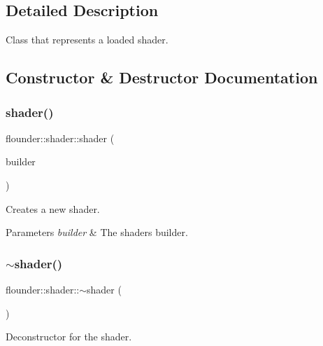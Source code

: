 \subsection{Detailed Description}
Class that represents a loaded shader. 



\subsection{Constructor \& Destructor Documentation}
\mbox{\label{classflounder_1_1shader_ae8c052148333a4c06a4dd31b56b072cf}} 
\subsubsection{\texorpdfstring{shader()}{shader()}}
{\footnotesize\ttfamily flounder\+::shader\+::shader (\begin{DoxyParamCaption}\item[{\hyperlink{classflounder_1_1shader_1_1builder}{builder} $\ast$}]{builder }\end{DoxyParamCaption})\hspace{0.3cm}{\ttfamily [protected]}}



Creates a new shader. 


\begin{DoxyParams}{Parameters}
{\em builder} & The shaders builder. \\
\hline
\end{DoxyParams}
\mbox{\label{classflounder_1_1shader_abd3f0fc712e7e178f18bf275c85e3337}} 
\subsubsection{\texorpdfstring{$\sim$shader()}{~shader()}}
{\footnotesize\ttfamily flounder\+::shader\+::$\sim$shader (\begin{DoxyParamCaption}{ }\end{DoxyParamCaption})}



Deconstructor for the shader. 



